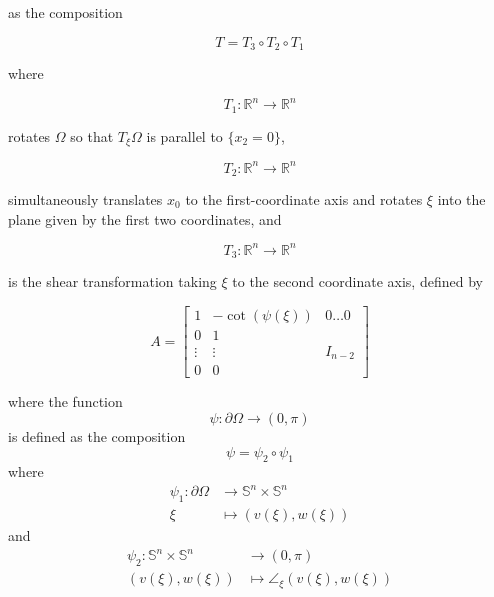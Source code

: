 \documentclass[letterpaper, 11pt, reqno]{amsart}
\newcommand\R{{\mathbb R}}
\theoremstyle{definition}
\begin{document}
as the composition

\begin{equation*}
    T= T_3 \circ T_2 \circ T_1
\end{equation*}

where

\begin{equation*}
T_1: \R^n  \longrightarrow \R^n
\end{equation*}

rotates $\Omega$ so that $T_\xi \Omega$ is parallel to $\{x_2=0\}$,

\begin{equation*}
T_2: \R^n  \longrightarrow \R^n
\end{equation*}

simultaneously translates $x_0$ to the first-coordinate axis and rotates $\xi$ into the plane given by the first two coordinates, and

\begin{equation*}
T_3: \R^n  \longrightarrow \R^n 
\end{equation*}

is the shear transformation taking $\xi$ to the second coordinate axis, defined by

\begin{equation}
A = \begin{bmatrix} \label{shear}
1      & -\cot(\psi(\xi))      & 0\dots0 \\
0      & 1      &         \\
\vdots & \vdots & I_{n-2} \\
0      & 0      & 
\end{bmatrix}
\end{equation}


where the function 
\begin{equation}
    \psi: \partial \Omega \longrightarrow (0, \pi)
    \end{equation}
is defined as the composition
\begin{equation*}
    \psi = \psi_2 \circ \psi_1
    \end{equation*}
    where
    \begin{align*}
        \psi_1: \partial \Omega & \longrightarrow \mathbb{S}^n \times \mathbb{S}^n\\
        \xi &\longmapsto (v(\xi),w(\xi))
    \end{align*}
    and
    \begin{align*}
        \psi_2: \mathbb{S}^n \times \mathbb{S}^n & \longrightarrow (0,\pi)\\
        (v(\xi),w(\xi)) &\longmapsto \angle_\xi (v(\xi),w(\xi))
    \end{align*}
\end{document}

